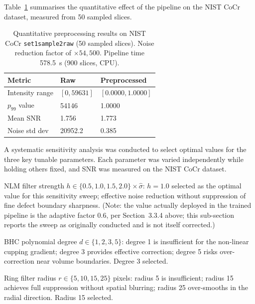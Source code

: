 Table~\ref{tab:preproc_results} summarises the quantitative effect of the pipeline on the NIST CoCr
dataset, measured from 50 sampled slices.

\begin{table}[htbp]
\centering
\caption{Quantitative preprocessing results on NIST CoCr \texttt{set1sample2raw} (50 sampled
  slices). Noise reduction factor of $\times 54{,}500$. Pipeline time 578.5~s (900 slices, CPU).}
\label{tab:preproc_results}
\begin{tabular}{lll}
\toprule
\textbf{Metric} & \textbf{Raw} & \textbf{Preprocessed} \\
\midrule
Intensity range & $[0, 59631]$ & $[0.0000, 1.0000]$ \\
$p_{99}$ value & 54146 & 1.0000 \\
Mean SNR & 1.756 & 1.773 \\
Noise std dev & 20952.2 & 0.385 \\
\bottomrule
\end{tabular}
\end{table}

A systematic sensitivity analysis was conducted to select optimal values for the three key tunable
parameters. Each parameter was varied independently while holding others fixed, and SNR was measured
on the NIST CoCr dataset.

NLM filter strength $h \in \{0.5, 1.0, 1.5, 2.0\} \times \hat{\sigma}$: $h = 1.0$ selected as the
optimal value for this sensitivity sweep; effective noise reduction without suppression of fine
defect boundary sharpness. (Note: the value actually deployed in the trained pipeline is the
adaptive factor 0.6, per Section~3.3.4 above; this sub-section reports the sweep as originally
conducted and is not itself corrected.)

BHC polynomial degree $d \in \{1, 2, 3, 5\}$: degree 1 is insufficient for the non-linear cupping
gradient; degree 3 provides effective correction; degree 5 risks over-correction near volume
boundaries. Degree 3 selected.

Ring filter radius $r \in \{5, 10, 15, 25\}$ pixels: radius 5 is insufficient; radius 15 achieves
full suppression without spatial blurring; radius 25 over-smooths in the radial direction. Radius 15
selected.

